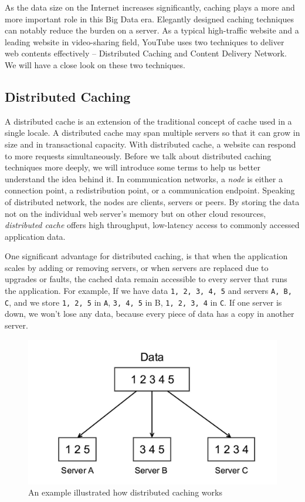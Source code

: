 As the data size on the Internet increases significantly, caching plays a more and more important role in this Big Data era. Elegantly designed caching techniques can notably reduce the burden on a server.  
As a typical high-traffic website and a leading website in video-sharing field, YouTube uses two techniques to deliver web contents effectively -- Distributed Caching and Content Delivery Network. We will have a close look on these two techniques.
\subsection{Distributed Caching}
A distributed cache is an extension of the traditional concept of cache used in a single locale. A distributed cache may span multiple servers so that it can grow in size and in transactional capacity\cite{wiki:dcache}. With distributed cache, a website can respond to more requests simultaneously. Before we talk about distributed caching techniques more deeply, we will introduce some terms to help us better understand the idea behind it. In communication networks, a \textit{node} is either a connection point, a redistribution point, or a communication endpoint. Speaking of distributed network, the nodes are clients, servers or peers. By storing the data not on the individual web server's memory but on other cloud resources, \textit{distributed cache} offers high throughput, low-latency access to commonly accessed application data.

One significant advantage for distributed caching, is that when the application scales by adding or removing servers, or when servers are replaced due to upgrades or faults, the cached data remain accessible to every server that runs the application. For example, If we have data \texttt{1, 2, 3, 4, 5} and servers \texttt{A, B, C}, and we store \texttt{1, 2, 5} in \texttt{A}, \texttt{3, 4, 5} in B, \texttt{1, 2, 3, 4} in \texttt{C}. If one server is down, we won't lose any data, because every piece of data has a copy in another server.
\begin{figure}[H]
	\centering
	\includegraphics[width=0.7\linewidth]{server.jpg}
	\caption{An example illustrated how distributed caching works}
\end{figure}


